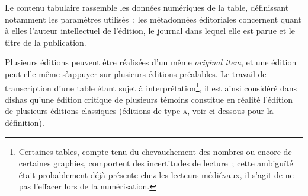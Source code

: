\documentclass[a4paper,12pt,twoside]{book}
\newcommand{\eng}{\emph}
\newcommand{\oi}{\eng{original item}\xspace}
\newcommand{\dishas}{\gls{dishas}\xspace}
\begin{document}
Le contenu tabulaire rassemble les données numériques de la table, définissant notamment les paramètres utilisés~; les métadonnées éditoriales concernent quant à elles l'auteur intellectuel de l'édition, le journal dans lequel elle est parue et le titre de la publication.

Plusieurs éditions peuvent être réalisées d'un même \oi, et une édition peut elle-même s'appuyer sur plusieurs éditions préalables. Le travail de transcription d'une table étant sujet à interprétation\footnote{Certaines tables, compte tenu du chevauchement des nombres ou encore de certaines graphies, comportent des incertitudes de lecture~; cette ambiguïté était probablement déjà présente chez les lecteurs médiévaux, il s'agit de ne pas l'effacer lors de la numérisation.}, il est ainsi considéré dans \dishas qu'une édition critique de plusieurs témoins constitue en réalité l'édition de plusieurs éditions classiques (éditions de type \textsc{a}, voir ci-dessous pour la définition).
\end{document}
